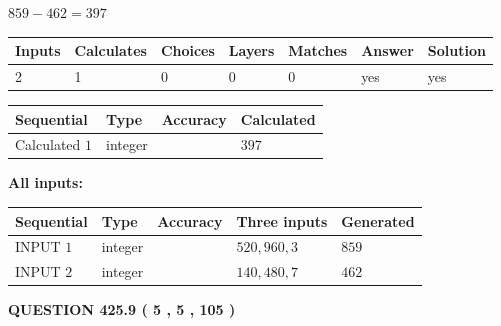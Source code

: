 \documentclass{ctexart}
\begin{document}
 

$ %
859 -  %
462=   %
397$
 
 
\noindent{}
 
 

 
   
   
   
   
\noindent\begin{tabular}{|l|l|l|l|l|l|l|}
 \hline
Inputs & Calculates & Choices & Layers & Matches & Answer & Solution \\ \hline
 2  & 
 1  & 
 0
  & 
 0  & 
 0  & 
  yes & 
  yes 
  \\ \hline
 \end{tabular}
   
   
   
   
\noindent{}
   
   
  
  
\noindent\begin{tabular}{|l|l|l|l|}
\hline
 Sequential & Type & Accuracy & Calculated \\ 
\hline
 
 
  Calculated $  1 $ & integer &  & 
  $ 397 $ 
 \\  \hline  
 \end{tabular}
   
   
   
   
\noindent\vspace{0.1in}\hspace{-0.08in} {\textbf{\Large{All inputs: }}}
   
   
  
  
\noindent\begin{tabular}{|l|l|l|l|l|}
\hline
 Sequential & Type & Accuracy & Three inputs & Generated \\ 
\hline
 
 
  INPUT $  1 $ & integer &  & $
 520
 , 
 960
 , 
 3
 $ & $ 859 $ 
 \\  \hline  
 
 
  INPUT $  2 $ & integer &  & $
 140
 , 
 480
 , 
 7
 $ & $ 462 $ 
 \\  \hline  
 \end{tabular}
   
   
  
\vspace{0.2in}
  
{\textbf{\Large{QUESTION
425.9 
 ( 5 , 5 , 105 )
}}}
  
\end{document}
